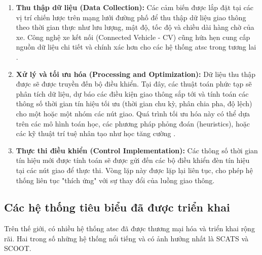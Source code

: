 \begin{enumerate}
    \item \textbf{Thu thập dữ liệu (Data Collection):} Các cảm biến được lắp đặt
        tại các vị trí chiến lược trên mạng lưới đường phố để thu thập dữ liệu
        giao thông theo thời gian thực như lưu lượng, mật độ, tốc độ và chiều
        dài hàng chờ của xe. Công nghệ xe kết nối (Connected Vehicle - CV) cũng hứa
        hẹn cung cấp nguồn dữ liệu chi tiết và chính xác hơn cho các hệ thống \ac{atsc}
        trong tương lai \cite{Wang2018}.

    \item \textbf{Xử lý và tối ưu hóa (Processing and Optimization):} Dữ liệu
        thu thập được sẽ được truyền đến bộ điều khiển. Tại đây, các thuật toán
        phức tạp sẽ phân tích dữ liệu, dự báo các điều kiện giao thông sắp tới và
        tính toán các thông số thời gian tín hiệu tối ưu (thời gian chu kỳ, phân
        chia pha, độ lệch) cho một hoặc một nhóm các nút giao. Quá trình tối ưu
        hóa này có thể dựa trên các mô hình toán học, các phương pháp phỏng đoán
        (heuristics), hoặc các kỹ thuật trí tuệ nhân tạo như học tăng cường
        \cite{Wei2019}.

    \item \textbf{Thực thi điều khiển (Control Implementation):} Các thông số
        thời gian tín hiệu mới được tính toán sẽ được gửi đến các bộ điều khiển
        đèn tín hiệu tại các nút giao để thực thi. Vòng lặp này được lặp lại liên
        tục, cho phép hệ thống liên tục "thích ứng" với sự thay đổi của luồng
        giao thông.
\end{enumerate}

\subsection{Các hệ thống tiêu biểu đã được triển khai}
Trên thế giới, có nhiều hệ thống \ac{atsc} đã được thương mại hóa và triển khai
rộng rãi. Hai trong số những hệ thống nổi tiếng và có ảnh hưởng nhất là SCATS và
SCOOT.

